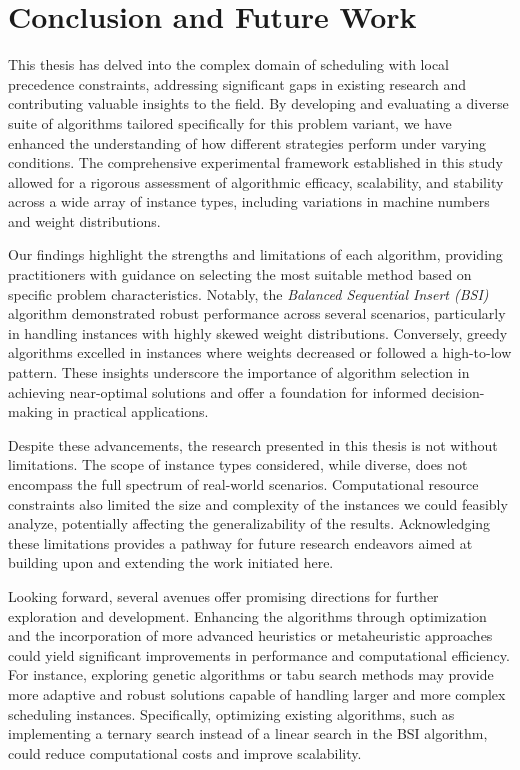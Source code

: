 \chapter{Conclusion and Future Work}

This thesis has delved into the complex domain of scheduling with local precedence constraints, addressing significant gaps in existing research and contributing valuable insights to the field. By developing and evaluating a diverse suite of algorithms tailored specifically for this problem variant, we have enhanced the understanding of how different strategies perform under varying conditions. The comprehensive experimental framework established in this study allowed for a rigorous assessment of algorithmic efficacy, scalability, and stability across a wide array of instance types, including variations in machine numbers and weight distributions.

Our findings highlight the strengths and limitations of each algorithm, providing practitioners with guidance on selecting the most suitable method based on specific problem characteristics. Notably, the \textit{Balanced Sequential Insert (BSI)} algorithm demonstrated robust performance across several scenarios, particularly in handling instances with highly skewed weight distributions. Conversely, greedy algorithms excelled in instances where weights decreased or followed a high-to-low pattern. These insights underscore the importance of algorithm selection in achieving near-optimal solutions and offer a foundation for informed decision-making in practical applications.

Despite these advancements, the research presented in this thesis is not without limitations. The scope of instance types considered, while diverse, does not encompass the full spectrum of real-world scenarios. Computational resource constraints also limited the size and complexity of the instances we could feasibly analyze, potentially affecting the generalizability of the results. Acknowledging these limitations provides a pathway for future research endeavors aimed at building upon and extending the work initiated here.

Looking forward, several avenues offer promising directions for further exploration and development. Enhancing the algorithms through optimization and the incorporation of more advanced heuristics or metaheuristic approaches could yield significant improvements in performance and computational efficiency. For instance, exploring genetic algorithms or tabu search methods may provide more adaptive and robust solutions capable of handling larger and more complex scheduling instances. Specifically, optimizing existing algorithms, such as implementing a ternary search instead of a linear search in the BSI algorithm, could reduce computational costs and improve scalability.

